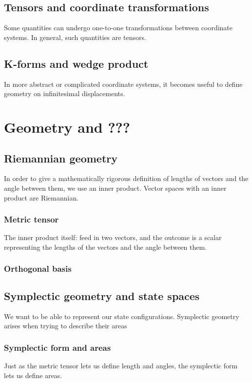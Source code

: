 \documentclass{book}
\begin{document}
\section{Tensors and coordinate transformations}
Some quantities can undergo one-to-one transformations between coordinate systems. In general, such quantities are tensors. 
\section{K-forms and wedge product}
In more abstract or complicated coordinate systems, it becomes useful to define geometry on infinitesimal displacements. 
\chapter{Geometry and ???}

\section{Riemannian geometry}
In order to give a mathematically rigorous definition of lengths of vectors and the angle between them, we use an inner product. Vector spaces with an inner product are Riemannian. 
\subsection{Metric tensor}
The inner product itself: feed in two vectors, and the outcome is a scalar representing the lengths of the vectors and the angle between them. 
\subsection{Orthogonal basis}

\section{Symplectic geometry and state spaces}
We want to be able to represent our state configurations. Symplectic geometry arises when trying to describe their areas

\subsection{Symplectic form and areas}
Just as the metric tensor lets us define length and angles, the symplectic form lets us define areas. 
\end{document}
